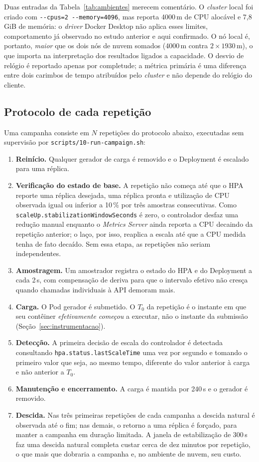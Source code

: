 \documentclass[conference]{IEEEtran}
\begin{document}
Duas entradas da Tabela~\ref{tab:ambientes} merecem comentário. O \emph{cluster}
local foi criado com \texttt{-{}-cpus=2 -{}-memory=4096}, mas reporta 4000\,m de
CPU alocável e 7,8\,GiB de memória: o \emph{driver} Docker Desktop não aplica
esses limites, comportamento já observado no estudo anterior e aqui confirmado. O
nó local é, portanto, \emph{maior} que os dois nós de nuvem somados (4000\,m
contra $2\times1930$\,m), o que importa na interpretação dos resultados ligados a
capacidade. O desvio de relógio é reportado apenas por completude; a métrica
primária é uma diferença entre dois carimbos de tempo atribuídos pelo
\emph{cluster} e não depende do relógio do cliente.

\subsection{Protocolo de cada repetição}

Uma campanha consiste em $N$ repetições do protocolo abaixo, executadas sem
supervisão por \texttt{scripts/10-run-campaign.sh}:

\begin{enumerate}
\item \textbf{Reinício.} Qualquer gerador de carga é removido e o Deployment é
escalado para uma réplica.
\item \textbf{Verificação do estado de base.} A repetição não começa até que o
HPA reporte uma réplica desejada, uma réplica pronta e utilização de CPU
observada igual ou inferior a 10\,\% por três amostras consecutivas. Como
\texttt{scaleUp.stabilizationWindowSeconds} é zero, o controlador desfaz uma
redução manual enquanto o \emph{Metrics Server} ainda reporta a CPU decaindo da
repetição anterior; o laço, por isso, reaplica a escala até que a CPU medida
tenha de fato decaído. Sem essa etapa, as repetições não seriam independentes.
\item \textbf{Amostragem.} Um amostrador registra o estado do HPA e do Deployment
a cada 2\,s, com compensação de deriva para que o intervalo efetivo não cresça
quando chamadas individuais à API demoram mais.
\item \textbf{Carga.} O Pod gerador é submetido. O $T_0$ da repetição é o
instante em que seu contêiner \emph{efetivamente começou} a executar, não o
instante da submissão (Seção~\ref{sec:instrumentacao}).
\item \textbf{Detecção.} A primeira decisão de escala do controlador é detectada
consultando \texttt{hpa.status.lastScaleTime} uma vez por segundo e tomando o
primeiro valor que seja, ao mesmo tempo, diferente do valor anterior à carga e
não anterior a $T_0$.
\item \textbf{Manutenção e encerramento.} A carga é mantida por 240\,s e o
gerador é removido.
\item \textbf{Descida.} Nas três primeiras repetições de cada campanha a descida
natural é observada até o fim; nas demais, o retorno a uma réplica é forçado,
para manter a campanha em duração limitada. A janela de estabilização de 300\,s
faz uma descida natural completa custar cerca de dez minutos por repetição, o que
mais que dobraria a campanha e, no ambiente de nuvem, seu custo.
\end{enumerate}
\end{document}

